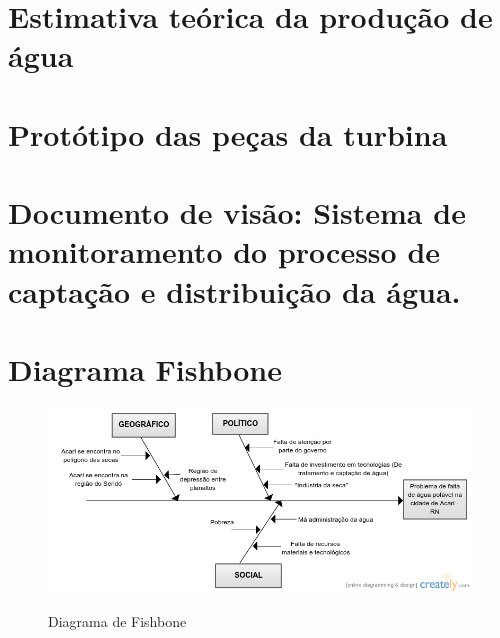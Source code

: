 \begin{anexosenv}
% 
%  
% 
% 
%   
%   
% 
%   
% 

\chapter{Estimativa teórica da produção de água}
  \label{estimativa_producao_agua}
  

\chapter{Protótipo das peças da turbina}
  \label{prototipos_catia}
  
  
\chapter{Documento de visão: Sistema de monitoramento do processo de captação e distribuição da água.}

  

\chapter{Diagrama Fishbone}
  
  \begin{figure}[!h]
    \centering
    \includegraphics[scale = 0.7, angle = 90]{editaveis/figuras/fishbone}
    \label{fishbone}
    \caption{Diagrama de Fishbone}
   \end{figure}
   \FloatBarrier

\end{anexosenv}

